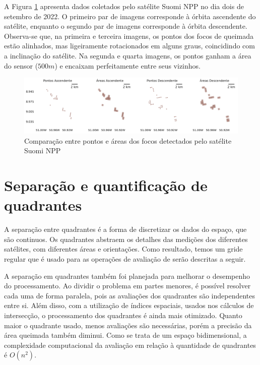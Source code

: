 \documentclass[cic,tc]{iiufrgs}
\begin{document}
A Figura \ref{fig:comparacao_pontos_e_areas} apresenta dados coletados pelo satélite  Suomi NPP no dia dois de setembro de 2022. O primeiro par de imagens corresponde à órbita ascendente do satélite, enquanto o segundo par de imagens corresponde à órbita descendente. Observa-se que, na primeira e terceira imagens, os pontos dos focos de queimada estão alinhados, mas ligeiramente rotacionados em alguns graus, coincidindo com a inclinação do satélite. Na segunda e quarta imagens, os pontos ganham a área do sensor ($500m$) e encaixam perfeitamente entre seus vizinhos. \par

\begin{figure}[H]
    \caption{Comparação entre pontos e áreas dos focos detectados pelo satélite Suomi NPP}
    \begin{center}
        \includegraphics[width=35em]{comparacao_pontos_e_areas}
    \end{center}
    \label{fig:comparacao_pontos_e_areas}
\end{figure}

\section{Separação e quantificação de quadrantes}

A separação entre quadrantes é a forma de discretizar os dados do espaço, que são continuos. Os quadrantes abstraem os detalhes das medições dos diferentes satélites, com diferentes áreas e orientações. Como resultado, temos um gride regular que é usado para as operações de avaliação de serão descritas a seguir. \par

A separação em quadrantes também foi planejada para melhorar o desempenho do processamento. Ao dividir o problema em partes menores, é possível resolver cada uma de forma paralela, pois as avaliações dos quadrantes são independentes entre si. Além disso, com a utilização de índices espaciais, usados nos cálculos de intersecção, o processamento dos quadrantes é ainda mais otimizado. Quanto maior o quadrante usado, menos avaliações são necessárias, porém a precisão da área queimada também diminui. Como se trata de um espaço bidimensional, a complexidade computacional da avaliação em relação à quantidade de quadrantes é $O(n^2)$. \par
\end{document}
